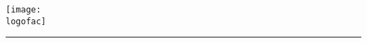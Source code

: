 
\begin{titlepage}
    \begin{center}
        \texttt{[image: \\logofac]}\\
        \vspace{-0.5cm}
        \textbf{\huge{\universidad}}
        
        \Large{\carrera}
        
        \vspace{-0.3cm}
        \LARGE{\materia}
        
        \vspace{-0.5cm}
        \rule{10cm}{0.01cm}\\
        \LARGE{\textbf{\unidad}}
        
        \vspace{-0.3cm}
        
        \Large{\titulo}
        

\end{center}
\end{titlepage}
